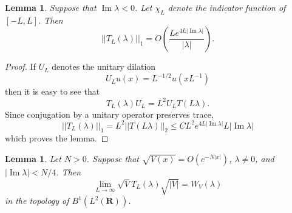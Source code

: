 \documentclass[12pt]{report}
\newcommand{\RR}{\mathbf{R}}
\renewcommand{\Im}{\operatorname{Im}}
\newtheorem{lemma}[theorem]{Lemma}
\theoremstyle{definition}
\begin{document}
\begin{lemma}
\label{estimate on TL}
Suppose that $\Im \lambda < 0$. Let $\chi_L$ denote the indicator function of $[-L, L]$. Then
$$||T_L(\lambda)||_1 = O\left(\frac{Le^{4L|\Im \lambda|}}{|\lambda|}\right).$$
\end{lemma}
\begin{proof}
If $U_L$ denotes the unitary dilation
$$U_Lu(x) = L^{-1/2}u(xL^{-1})$$
then it is easy to see that
$$T_L(\lambda)U_L = L^2U_LT(L\lambda).$$
Since conjugation by a unitary operator preserves trace,
$$||T_L(\lambda)||_1 = L^2 ||T(L\lambda)||_2 \leq CL^2 e^{4L|\Im \lambda|}{L|\Im \lambda|}$$
which proves the lemma.
\end{proof}

\begin{lemma}
\label{convergence in b1 topology}
Let $N > 0$. Suppose that $\sqrt{V(x)} = O(e^{-N|x|})$, $\lambda \neq 0$, and $|\Im \lambda| < N/4$. Then
$$\lim_{L \to \infty} \sqrt V T_L(\lambda) \sqrt{|V|} = W_V(\lambda)$$
in the topology of $B^1(L^2(\RR))$.
\end{lemma}
\end{document}
